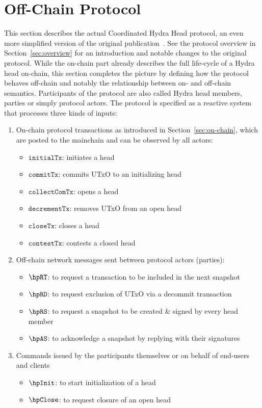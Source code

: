 \section{Off-Chain Protocol}\label{sec:offchain}

This section describes the actual Coordinated Hydra Head protocol, an even more
simplified version of the original publication~\cite{hydrahead20}. See the
protocol overview in Section~\ref{sec:overview} for an introduction and notable
changes to the original protocol. While the on-chain part already describes the
full life-cycle of a Hydra head on-chain, this section completes the picture by
defining how the protocol behaves off-chain and notably the relationship between
on- and off-chain semantics. Participants of the protocol are also called Hydra
head members, parties or simply protocol actors. The protocol is specified as a
reactive system that processes three kinds of inputs:
\begin{enumerate}
	\item On-chain protocol transactions as introduced in
	      Section~\ref{sec:on-chain}, which are posted to the mainchain and can be
	      observed by all actors:
	      \begin{itemize}
		      \item $\mathtt{initialTx}$: initiates a head
		      \item $\mathtt{commitTx}$: commits UTxO to an initializing head
		      \item $\mathtt{collectComTx}$: opens a head
		      \item $\mathtt{decrementTx}$: removes UTxO from an open head
		      \item $\mathtt{closeTx}$: closes a head
		      \item $\mathtt{contestTx}$: contests a closed head
	      \end{itemize}
	\item Off-chain network messages sent between protocol actors (parties):
	      \begin{itemize}
		      \item $\hpRT$: to request a transaction to be included in the next snapshot
		      \item $\hpRD$: to request exclusion of UTxO via a decommit transaction
		      \item $\hpRS$: to request a snapshot to be created \& signed by every head member
		      \item $\hpAS$: to acknowledge a snapshot by replying with their signatures
	      \end{itemize}
	\item Commands issued by the participants themselves or on behalf of end-users and clients
	      \begin{itemize}
		      \item $\hpInit$: to start initialization of a head
		      \item $\hpClose$: to request closure of an open head
	      \end{itemize}
\end{enumerate}

